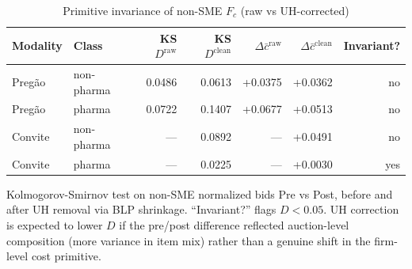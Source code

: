 \begin{table}[htbp]
\centering
\begin{threeparttable}
\caption{Primitive invariance of non-SME $F_c$ (raw vs UH-corrected)}
\label{tab:v3_uh_invariance}
\small
\begin{tabular}{llrrrrr}
\toprule
Modality & Class & KS $D^{\text{raw}}$ & KS $D^{\text{clean}}$ & $\Delta\bar{c}^{\text{raw}}$ & $\Delta\bar{c}^{\text{clean}}$ & Invariant? \\
\midrule
Preg\~ao & non-pharma & 0.0486 & 0.0613 & +0.0375 & +0.0362 & no \\
Preg\~ao & pharma & 0.0722 & 0.1407 & +0.0677 & +0.0513 & no \\
Convite & non-pharma & --- & 0.0892 & --- & +0.0491 & no \\
Convite & pharma & --- & 0.0225 & --- & +0.0030 & yes \\
\bottomrule
\end{tabular}
\begin{tablenotes}\footnotesize
\item Kolmogorov-Smirnov test on non-SME normalized bids Pre vs
Post, before and after UH removal via BLP shrinkage.
``Invariant?'' flags $D<0.05$. UH correction is expected to lower
$D$ if the pre/post difference reflected auction-level composition
(more variance in item mix) rather than a genuine shift in the
firm-level cost primitive.
\end{tablenotes}
\end{threeparttable}
\end{table}
